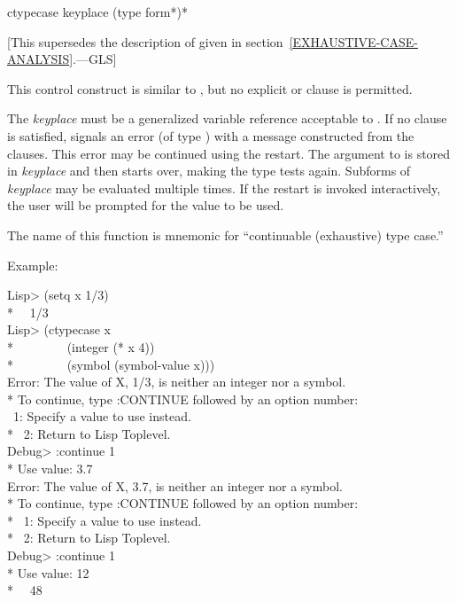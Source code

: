 \begin{defmac}
ctypecase keyplace {(type {form}*)}*

   [This supersedes the description of 
   given in section~\ref{EXHAUSTIVE-CASE-ANALYSIS}.---GLS]

  This control construct is similar to , but no explicit 
   or  clause is permitted.

  The \emph{keyplace} must be a generalized variable reference acceptable to .
  If no clause is satisfied,  signals an error (of type )
  with a message constructed from the clauses. This error may be continued
  using the  restart. The argument to  is stored in
  \emph{keyplace} and then  starts over, making the type tests again. 
  Subforms of \emph{keyplace} may be evaluated multiple times. If the 
  restart is invoked interactively, the user will be prompted for the value
  to be used.
  
  The name of this function is mnemonic for ``continuable (exhaustive) 
  type case.''


  Example:
\begin{lisp}
Lisp> (setq x 1/3) \\*
~\EV\ 1/3 \\
Lisp> (ctypecase x \\*
~~~~~~~~(integer (* x 4)) \\*
~~~~~~~~(symbol (symbol-value x))) \\
Error: The value of X, 1/3, is neither an integer nor a symbol. \\*
To continue, type :CONTINUE followed by an option number: \\
~1: Specify a value to use instead. \\*
~2: Return to Lisp Toplevel. \\
Debug> :continue 1 \\*
Use value: 3.7 \\
Error: The value of X, 3.7, is neither an integer nor a symbol. \\*
To continue, type :CONTINUE followed by an option number: \\*
~1: Specify a value to use instead. \\*
~2: Return to Lisp Toplevel. \\
Debug> :continue 1 \\*
Use value: 12 \\*
~\EV\ 48
\end{lisp}
\end{defmac}


